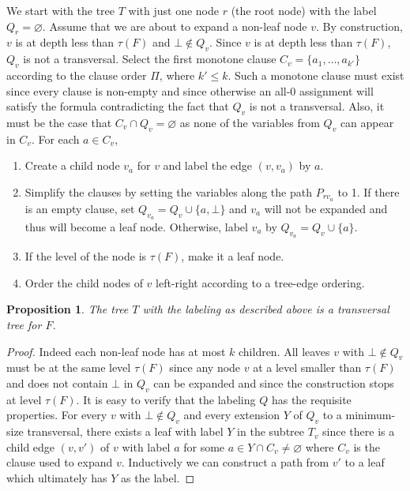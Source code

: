 \documentclass[10pt,a4paper]{article}
\let\emptyset\varnothing
\newtheorem{proposition}{Proposition}
\newcommand{\trn}{\tau}
\begin{document}
We start with the tree $T$ with just one node $r$
(the root node) with the label  $Q_r =\emptyset$.
Assume that we are about to expand a non-leaf node $v$.
By construction, $v$ is at depth less than $\trn(F)$ and $\bot \not\in Q_v$.
Since $v$ is at depth less than $\trn(F)$, $Q_v$ is not a transversal.
Select the first monotone clause 
$C_v = \{a_1, \ldots, a_{k'}\}$ according to the clause order $\Pi$, where $k'\le k$.
Such a monotone clause must 
exist since every clause is non-empty and since
otherwise an all-0 assignment will satisfy the formula
contradicting the fact that $Q_v$ is not a 
transversal. 
Also, it must be the case that 
$C_v\cap Q_v = \emptyset$ as none 
of the variables from $Q_v$ can appear in $C_v$.
For each $a\in C_v$,
\begin{enumerate}
\item Create a child node $v_a$ for $v$ and label the edge $(v, v_a)$ by $a$. 
\item Simplify the clauses 
by setting the variables
along the path $P_{rv_a}$ to 1. 
If there is an empty clause, set $Q_{v_a} = Q_v\cup\{a,\bot\}$ 
and $v_a$ 
will not be expanded and thus will become a leaf node.
Otherwise,
label $v_a$ by $Q_{v_a} = Q_v\cup \{a\}$. 
\item If the level
of the node is $\trn(F)$, make it a leaf node.
\item Order the child nodes of $v$ left-right according to a 
tree-edge ordering.
\end{enumerate}

\begin{proposition}
\label{prop:general-tree-existence}
The tree $T$ with the labeling as described above is a transversal tree for $F$.
\end{proposition}

\begin{proof}
Indeed each non-leaf node has at most $k$ children.
All leaves $v$ with $\bot\notin Q_v$ must be at the same level $\trn(F)$
since any node $v$ at a level smaller than $\trn(F)$ 
and does not contain $\bot$ in $Q_v$ can be expanded
and since the construction stops at level $\trn(F)$.
It is easy to verify that the labeling $Q$ has the requisite properties.
For every $v$ with $\bot \notin Q_v$
and every extension $Y$ of $Q_v$ to a minimum-size transversal, there exists a
leaf with label $Y$ in the subtree $T_v$ since there is a child edge $(v,v')$ of $v$ with label $a$ for some $a \in Y \cap C_v \ne \emptyset$ where $C_v$ is the clause used to expand $v$. Inductively we can construct a path from $v'$ to a leaf which ultimately has $Y$ as the label.
\end{proof}
\end{document}
